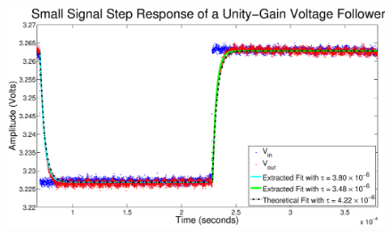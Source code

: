 \begin{figure}[H]
\centering
\includegraphics[width=\linewidth]{../Figures/Exp3P2.eps}
\caption{}
\label{fig:exp3p2}
\end{figure}